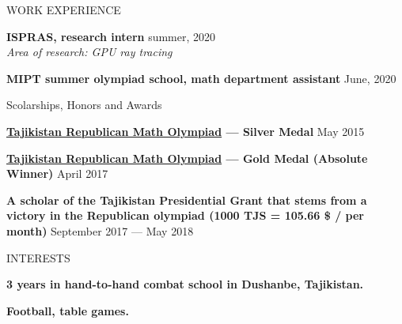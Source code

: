 \documentclass{resume}
\begin{document}



\begin{rSection}{WORK EXPERIENCE} \itemsep -1pt {}  

\item \textbf{ISPRAS, research intern} \hfill summer, 2020 \\
\textit{Area of research: GPU ray tracing}

\item \textbf{MIPT summer olympiad school, math department assistant} \hfill June, 2020 \\
\textit{}
\end{rSection}

\begin{rSection}{Scolarships, Honors and Awards} \itemsep -1pt {}  

\item \textbf{\href{http://mri.tj/?page_id=124}{\underline{Tajikistan Republican Math Olympiad}} --- Silver Medal} \hfill May 2015
\item \textbf{\href{http://mri.tj/?page_id=124}{\underline{Tajikistan Republican Math Olympiad}} --- Gold Medal (Absolute Winner)} \hfill April 2017
\item {\textbf{A scholar of the Tajikistan Presidential Grant that stems from a victory in the Republican olympiad (1000 TJS = 105.66 \$ / per month)}} \hfill September 2017 --- May 2018
\end{rSection}


\begin{rSection}{INTERESTS}
\item \textbf{3 years in hand-to-hand combat school in Dushanbe, Tajikistan.}
\item \textbf{Football,  table games.}
\end{rSection}
\end{document}
